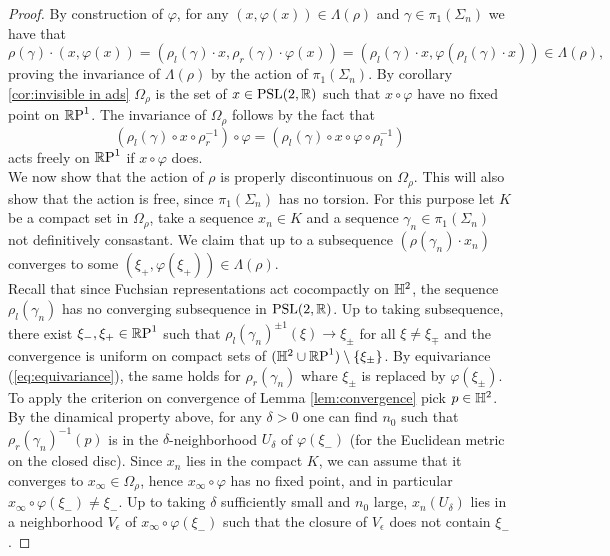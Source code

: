 \begin{proof}
    By construction of $\varphi$, for any $(x, \varphi(x)) \in \Lambda(\rho)$ and $\gamma \in \pi_1(\Sigma_n)$ we have that 
    \[
        \rho(\gamma) \cdot(x,\varphi(x)) = (\rho_l(\gamma) \cdot x, \rho_r(\gamma) \cdot \varphi(x)) = (\rho_l(\gamma) \cdot x,  \varphi(\rho_l(\gamma)\cdot x)) \in \Lambda(\rho), 
    \]
    proving the invariance of $\Lambda(\rho)$ by the action of $\pi_1(\Sigma_n)$. By corollary \ref{cor:invisible in ads} $\Omega_\rho$ is the set of $x \in \PSL$ such that $x\circ \varphi$ have no fixed point on $\S$. The invariance of $\Omega_\rho$ follows by the fact that
    \[
        (\rho_l(\gamma) \circ x \circ \rho_r^{-1} ) \circ \varphi = (\rho_l(\gamma) \circ x \circ \varphi \circ \rho_l^{-1})
    \]
    acts freely on $\S$ if $x \circ \varphi$  does.\\
    We now show that the action of $\rho$ is properly discontinuous on $\Omega_\rho$. This will also show that the action is free, since $\pi_1(\Sigma_n)$ has no torsion.
    For this purpose let $K$ be a compact set in $\Omega_\rho$, take a sequence $x_n \in K$ and a sequence $\gamma_n \in \pi_1(\Sigma_n)$ not definitively consastant. We claim that up to a subsequence $(\rho(\gamma_n)\cdot x_n)$ converges to some $(\xi_+, \varphi(\xi_+)) \in \Lambda(\rho)$.\\
    Recall that since Fuchsian representations act cocompactly on $\H^2$, the sequence $\rho_l(\gamma_n)$ has no converging subsequence in $\PSL$. Up to taking subsequence, there exist $\xi_-,\xi_+ \in \S$ such that $\rho_l(\gamma_n)^{\pm 1}(\xi) \to \xi_\pm$ for all $\xi \neq \xi_\mp$ and the convergence is uniform on compact sets of $(\H^2 \cup \S) \setminus \{\xi_\pm \}$. By equivariance (\ref{eq:equivariance}), the same holds for $\rho_r(\gamma_n)$ whare $\xi_\pm$ is replaced by $\varphi (\xi_\pm)$.\\
    To apply the criterion on convergence of Lemma \ref{lem:convergence} pick $p\in \H^2$. By the dinamical property above, for any $\delta >0$ one can find $n_0$ such that $\rho_r(\gamma_n)^{-1}(p)$ is in the $\delta$-neighborhood $U_\delta$ of $\varphi(\xi_-)$ (for the Euclidean metric on the closed disc).
    Since $x_n$ lies in the compact $K$, we can assume that it converges to $x_\infty \in \Omega_\rho$, hence $x_\infty \circ \varphi$ has no fixed point, and in particular $x_\infty \circ \varphi(\xi_-) \neq \xi_-$.
    Up to taking $\delta$ sufficiently small and $n_0$ large, $x_n(U_\delta)$ lies in a neighborhood $V_\epsilon$ of $x_\infty \circ \varphi(\xi_-)$ such that the closure of $V_\epsilon$ does not contain $\xi_-$.

\end{proof}
